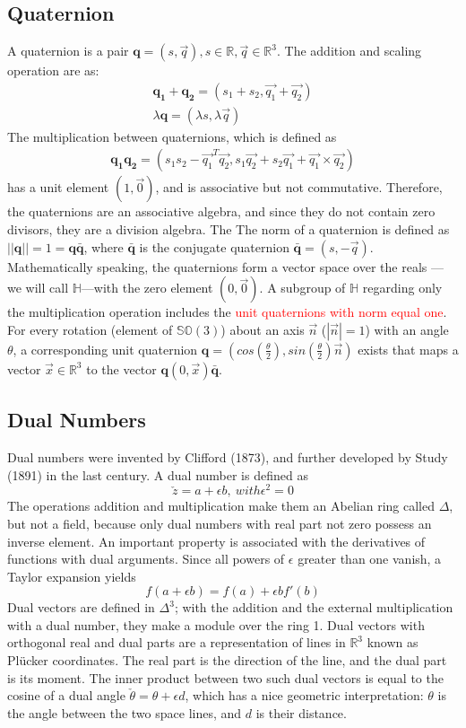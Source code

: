 \documentclass[a4paper]{report}
\begin{document}
\subsection{Quaternion}
A quaternion is a pair $\mathbf{q} = (s, \vec{q}), s\in \mathbb{R}, \vec{q} \in \mathbb{R}^3$. The addition and scaling operation are as:
\begin{align}
\mathbf{q_1}+\mathbf{q_2}=(s_1+s_2,\vec{q_1}+\vec{q_2})\\
\lambda\mathbf{q}=(\lambda s, \lambda \vec{q}) 
\end{align}
The multiplication between quaternions, which is defined as
\begin{align}
\mathbf{q_1}\mathbf{q_2}=(s_1s_2-\vec{q_1}^T\vec{q_2}, s_1\vec{q_2}+s_2\vec{q_1}+\vec{q_1}\times\vec{q_2})
\end{align}
has a unit element $(1, \vec{0})$, and is associative but not commutative. Therefore, the quaternions are an associative algebra, and since they do not contain zero divisors, they are a division algebra. The The norm of a quaternion is defined as $||\mathbf{q}||=1=\mathbf{q}\bar{\mathbf{q}}$, where $\bar{\mathbf{q}}$ is the conjugate quaternion $\bar{\mathbf{q}}=(s,-\vec{q})$. Mathematically speaking, the quaternions form a vector space over the reals — we will call $\mathbb{H}$—with the zero element $(0, \vec{0})$. A subgroup of $\mathbb{H}$ regarding only the multiplication operation includes the \textcolor{red}{unit quaternions with norm equal one}. For every rotation (element of $\mathbb{SO}(3)$) about an axis $\vec{n}$
($|\vec{n}|=1$) with an angle $\theta$, a corresponding unit quaternion $\mathbf{q}=(cos(\frac{\theta}{2}),sin(\frac{\theta}{2})\vec{n})$ exists that maps a vector $\vec{x} \in \mathbb{R}^3$ to the vector $\mathbf{q}(0, \vec{x})\bar{\mathbf{q}}$.
\subsection{Dual Numbers}
Dual numbers were invented by Clifford (1873), and further developed by Study (1891) in the last century. A dual number is defined as
$$
\check{z}=a+\epsilon b,\ with \epsilon^2=0
$$
The operations addition and multiplication make them an Abelian ring called $\Delta$, but not a field, because only dual numbers with real part not zero possess an inverse element. An important property is associated with the derivatives of functions with dual arguments. Since all powers of $\epsilon$ greater than
one vanish, a Taylor expansion yields
$$
f(a+\epsilon b)=f(a)+\epsilon bf'(b)
$$
Dual vectors are defined in $\Delta^3$; with the addition and the external multiplication with a dual number, they make a module over the ring 1. Dual vectors with orthogonal real and dual parts are a representation of lines in $\mathbb{R}^3$ known as Plücker coordinates. The real part is the direction of the line, and the
dual part is its moment. The inner product between two such
dual vectors is equal to the cosine of a dual angle $\check{\theta} = \theta+\epsilon d$, which has a nice geometric interpretation: $\theta$ is the angle between the two space lines, and $d$ is their distance.
\end{document}
